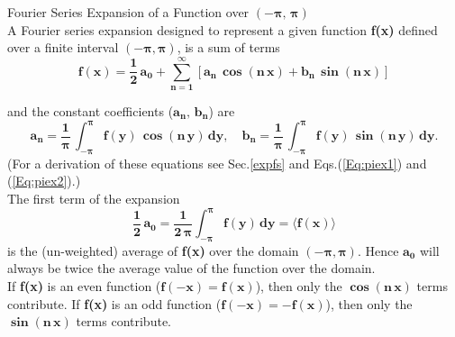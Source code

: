 \begin{compactitem}

\item {Fourier Series Expansion of a Function over $(-\boldsymbol{\pi,\,\pi})$}\\
A Fourier series expansion designed to represent a given function
  \textbf{f(x)} defined over a finite interval $(-\boldsymbol{\pi, \pi})$, is a sum of terms
\begin{equation}  \label{fxpi}
\mathbf{f(x) = \frac{1}{2} \, a_{0} + \sum_{n=1}^{\infty} \left[
   a_{n}\,\boldsymbol{\cos} (n\,x) + b_{n} \,\boldsymbol{\sin} (n\,x) \right] }
\end{equation}

\noindent and the constant coefficients ($\mathbf{a_{n},\, b_{n}}$) are
\begin{equation} \label{fcoeff}
 \mathbf{ a_{n} = \frac{1}{\boldsymbol{\pi}} \, \int_{-\boldsymbol{\pi}}^{\boldsymbol{\pi}} f(y)\,
   \boldsymbol{\cos} (n\,y) \, dy}, \quad
   \mathbf{ b_{n} = \frac{1}{\boldsymbol{\pi}} \, \int_{-\boldsymbol{\pi}}^{\boldsymbol{\pi}} f(y)\,
   \boldsymbol{\sin} (n\,y) \, dy}.
\end{equation}
(For a derivation of these equations see Sec.\ref{expfs} and Eqs.(\ref{Eq:piex1}) and
  (\ref{Eq:piex2}).)\\

\noindent The first term of the expansion
\begin{equation}
\mathbf{ \frac{1}{2} \, a_0  =
 \frac{1}{2\, \boldsymbol{\pi}}  \int_{-\boldsymbol{\pi}}^{\boldsymbol{\pi}} f(y)\,dy =
 \langle f(x) \rangle }
\end{equation}
is the (un-weighted) average of \textbf{f(x)} over the domain $(-\boldsymbol{\pi},\boldsymbol{\pi})$.
Hence $\mathbf{a_{0}}$ will always be twice the average value of the function over
  the domain.\\

\noindent If \textbf{f(x)} is an even function ($\mathbf{f(-x) =  f(x)}$),
  then only the $\mathbf{\boldsymbol{\cos}(n\,x)}$ terms
  contribute.
If \textbf{f(x)} is an odd function ($\mathbf{f(-x) =  -f(x)}$),
  then only the $\mathbf{\boldsymbol{\sin}(n\,x)}$ terms contribute. \\



\end{compactitem}
